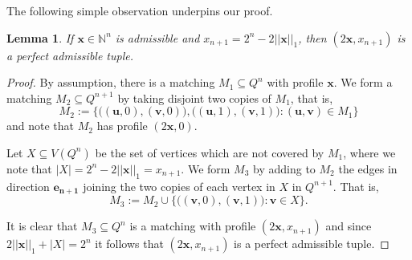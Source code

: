\documentclass{article}
\newtheorem{lemma}[theorem]{Lemma}
\begin{document}
The following simple observation underpins our proof.
\begin{lemma}\label{l:admissible}
If $\bm{x} \in \mathbb{N}^{n}$ is admissible and $x_{n+1} = 2^{n} - 2||\bm{x}||_1$, then $(2\bm{x},x_{n+1})$ is a perfect admissible tuple.
\end{lemma}
\begin{proof}
By assumption, there is a matching $M_1 \subseteq Q^{n}$ with profile $\bm{x}$. We form a matching $M_2 \subseteq Q^{n+1}$ by taking disjoint two copies of $M_1$, that is,
\[
M_2 := \{\big((\bm{u},0),(\bm{v},0)\big), \big((\bm{u},1),(\bm{v},1)\big) \colon (\bm{u},\bm{v}) \in M_1 \}
\]
and note that $M_2$ has profile $
(2\bm{x},0)$.

Let $X \subseteq V\left(Q^{n}\right)$ be the set of vertices which are not covered by $M_1$, where we note that $|X| = 2^{n} - 2||\bm{x}||_1 = x_{n+1}$. We form $M_3$ by adding to $M_2$ the edges in direction $\bm{e_{n+1}}$ joining the two copies of each vertex in $X$ in $Q^{n+1}$. That is, 
\[
M_3 := M_2 \cup \{ \big((\bm{v},0), (\bm{v},1) \big) \colon \bm{v} \in X \}.
\]

It is clear that $M_3 \subseteq Q^n$ is a matching with profile $(2\bm{x}, x_{n+1})$ and since $2||\bm{x}||_1 + |X| = 2^{n}$ it follows that $(2\bm{x}, x_{n+1})$ is a  perfect admissible tuple.
\end{proof}
\end{document}
